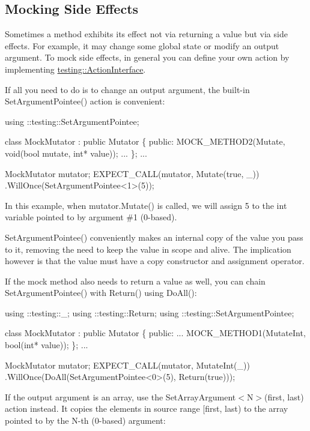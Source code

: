 \subsection*{Mocking Side Effects}

Sometimes a method exhibits its effect not via returning a value but via side effects. For example, it may change some global state or modify an output argument. To mock side effects, in general you can define your own action by implementing {\ttfamily \hyperlink{classtesting_1_1_action_interface}{testing\+::\+Action\+Interface}}.

If all you need to do is to change an output argument, the built-\/in {\ttfamily Set\+Argument\+Pointee()} action is convenient\+:


\begin{DoxyCode}
using ::testing::SetArgumentPointee;

class MockMutator : public Mutator \{
 public:
  MOCK\_METHOD2(Mutate, void(bool mutate, int* value));
  ...
\};
...

  MockMutator mutator;
  EXPECT\_CALL(mutator, Mutate(true, \_))
      .WillOnce(SetArgumentPointee<1>(5));
\end{DoxyCode}


In this example, when {\ttfamily mutator.\+Mutate()} is called, we will assign 5 to the {\ttfamily int} variable pointed to by argument \#1 (0-\/based).

{\ttfamily Set\+Argument\+Pointee()} conveniently makes an internal copy of the value you pass to it, removing the need to keep the value in scope and alive. The implication however is that the value must have a copy constructor and assignment operator.

If the mock method also needs to return a value as well, you can chain {\ttfamily Set\+Argument\+Pointee()} with {\ttfamily Return()} using {\ttfamily Do\+All()}\+:


\begin{DoxyCode}
using ::testing::\_;
using ::testing::Return;
using ::testing::SetArgumentPointee;

class MockMutator : public Mutator \{
 public:
  ...
  MOCK\_METHOD1(MutateInt, bool(int* value));
\};
...

  MockMutator mutator;
  EXPECT\_CALL(mutator, MutateInt(\_))
      .WillOnce(DoAll(SetArgumentPointee<0>(5),
                      Return(true)));
\end{DoxyCode}


If the output argument is an array, use the {\ttfamily Set\+Array\+Argument$<$N$>$(first, last)} action instead. It copies the elements in source range {\ttfamily \mbox{[}first, last)} to the array pointed to by the {\ttfamily N}-\/th (0-\/based) argument\+:


